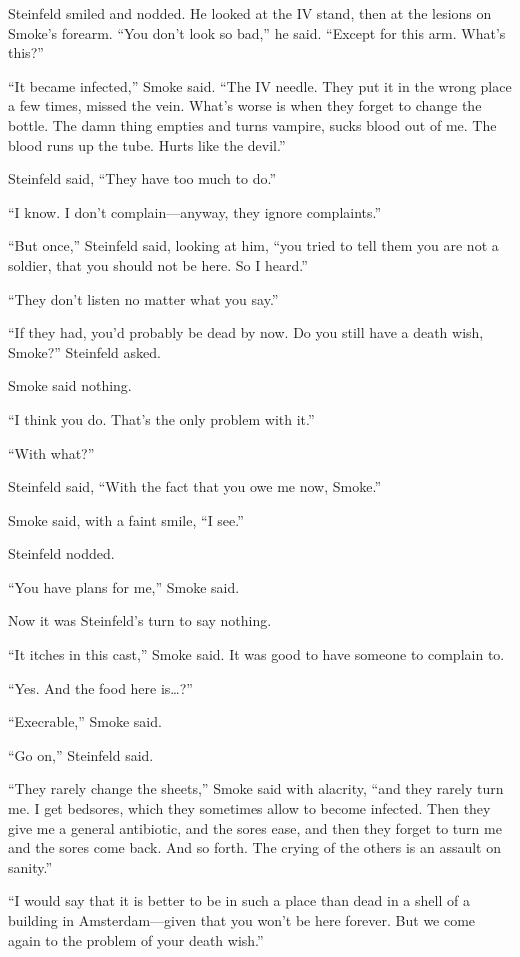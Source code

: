 Steinfeld smiled and nodded. He looked at the IV stand, then at the lesions on Smoke's forearm. ``You don't look so bad,'' he said. ``Except for this arm. What's this?''

``It became infected,'' Smoke said. ``The IV needle. They put it in the wrong place a few times, missed the vein. What's worse is when they forget to change the bottle. The damn thing empties and turns vampire, sucks blood out of me. The blood runs up the tube. Hurts like the devil.''

Steinfeld said, ``They have too much to do.''

``I know. I don't complain---anyway, they ignore complaints.''

``But once,'' Steinfeld said, looking at him, ``you tried to tell them you are not a soldier, that you should not be here. So I heard.''

``They don't listen no matter what you say.''

``If they had, you'd probably be dead by now. Do you still have a death wish, Smoke?'' Steinfeld asked.

Smoke said nothing.

``I think you do. That's the only problem with it.''

``With what?''

Steinfeld said, ``With the fact that you owe me now, Smoke.''

Smoke said, with a faint smile, ``I see.''

Steinfeld nodded.

``You have plans for me,'' Smoke said.

Now it was Steinfeld's turn to say nothing.

``It itches in this cast,'' Smoke said. It was good to have someone to complain to.

``Yes. And the food here is\ldots ?''

``Execrable,'' Smoke said.

``Go on,'' Steinfeld said.

``They rarely change the sheets,'' Smoke said with alacrity, ``and they rarely turn me. I get bedsores, which they sometimes allow to become infected. Then they give me a general antibiotic, and the sores ease, and then they forget to turn me and the sores come back. And so forth. The crying of the others is an assault on sanity.''

``I would say that it is better to be in such a place than dead in a shell of a building in Amsterdam---given that you won't be here forever. But we come again to the problem of your death wish.''

